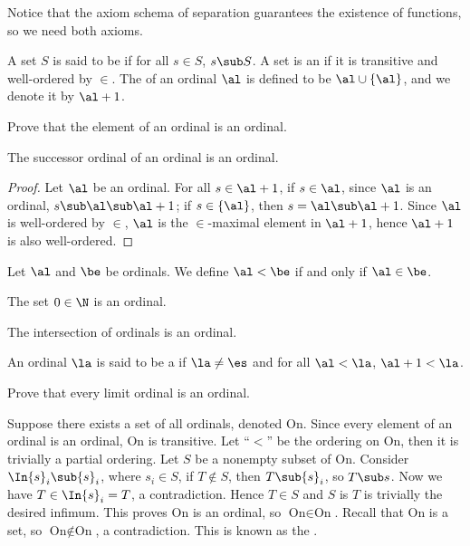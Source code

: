 \documentclass[10pt]{article}
\begin{document}
\par
Notice that the axiom schema of separation guarantees the existence of functions, so we need both axioms.
\begin{definition}
    A set $S$ is said to be  if for all $s\in S$, $s\sub S$. A set is an  if it is transitive and well-ordered by $\in$. The  of an ordinal $\al$ is defined to be $\al\cup\{\al\}$, and we denote it by $\al+1$. 
\end{definition}
\begin{problem}
    Prove that the element of an ordinal is an ordinal.
\end{problem}
\begin{proposition}
    The successor ordinal of an ordinal is an ordinal.
\end{proposition}
\begin{proof}
    Let $\al$ be an ordinal. For all $s\in\al+1$, if $s\in\al$, since $\al$ is an ordinal, $s\sub\al\sub\al+1$; if $s\in\{\al\}$, then $s=\al\sub\al+1$. Since $\al$ is well-ordered by $\in$, $\al$ is the $\in$-maximal element in $\al+1$, hence $\al+1$ is also well-ordered.
\end{proof}
\par
Let $\al$ and $\be$ be ordinals. We define $\al<\be$ if and only if $\al\in\be$.
\begin{example}
    The set $0\in\N$ is an ordinal.
\end{example}
\begin{problem}
    The intersection of ordinals is an ordinal.
\end{problem}
\begin{definition}
    An ordinal $\la$ is said to be a  if $\la\ne\es$ and for all $\al<\la$, $\al+1<\la$.
\end{definition}
\begin{problem}
    Prove that every limit ordinal is an ordinal.
\end{problem}
\par
Suppose there exists a set of all ordinals, denoted $\text{On}$. Since every element of an ordinal is an ordinal, $\text{On}$ is transitive. Let ``$<$'' be the ordering on $\text{On}$, then it is trivially a partial ordering. Let $S$ be a nonempty subset of $\text{On}$. Consider $\In{s}_{i}\sub{s}_{i}$, where ${s}_{i}\in S$, if $T\notin S$, then $T\sub{s}_{i}$, so $T\sub s$. Now we have $T\in\In{s}_{i}=T$, a contradiction. Hence $T\in S$ and $S$ is $T$ is trivially the desired infimum. This proves $\text{On}$ is an ordinal, so $\text{On}\in\text{On}$. Recall that $\text{On}$ is a set, so $\text{On}\notin\text{On}$, a contradiction. This is known as the .
\end{document}
